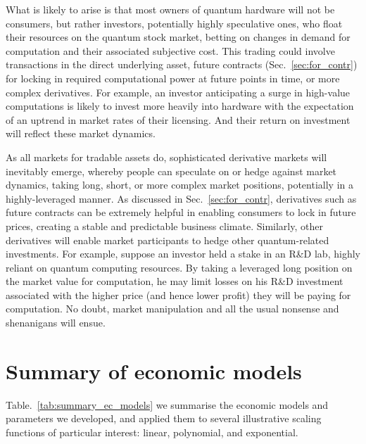 What is likely to arise is that most owners of quantum hardware will not be consumers, but rather investors, potentially highly speculative ones, who float their resources on the quantum stock market, betting on changes in demand for computation and their associated subjective cost. This trading could involve transactions in the direct underlying asset, future contracts (Sec.~\ref{sec:for_contr}) for locking in required computational power at future points in time, or more complex derivatives. For example, an investor anticipating a surge in high-value computations is likely to invest more heavily into hardware with the expectation of an uptrend in market rates of their licensing. And their return on investment will reflect these market dynamics.

As all markets for tradable assets do, sophisticated derivative markets will inevitably emerge, whereby people can speculate on or hedge against market dynamics, taking long, short, or more complex market positions, potentially in a highly-leveraged manner. As discussed in Sec.~\ref{sec:for_contr}, derivatives such as future contracts can be extremely helpful in enabling consumers to lock in future prices, creating a stable and predictable business climate. Similarly, other derivatives will enable market participants to hedge other quantum-related investments. For example, suppose an investor held a stake in an R\&D lab, highly reliant on quantum computing resources. By taking a leveraged long position on the market value for computation, he may limit losses on his R\&D investment associated with the higher price (and hence lower profit) they will be paying for computation. No doubt, market manipulation and all the usual nonsense and shenanigans will ensue.

%
%

\section{Summary of economic models}

 Table.~\ref{tab:summary_ec_models} we summarise the economic models and parameters we developed, and applied them to several illustrative scaling functions of particular interest: linear, polynomial, and exponential.


\startnormtable
\renewcommand{\arraystretch}{0.5}

